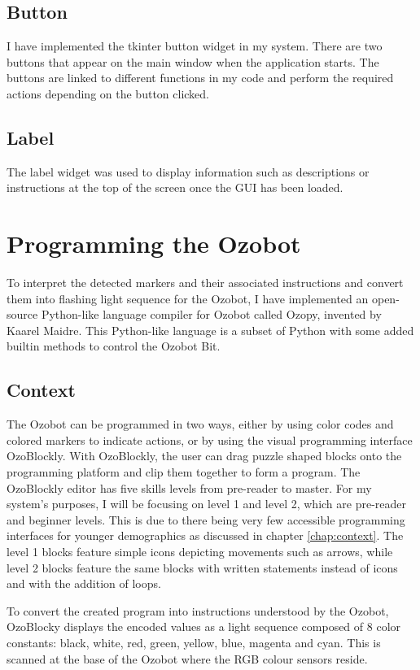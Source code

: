 \documentclass[oneside,%
                    author={Malak Hajji},
                    degree={BSc},
                    title={Designing An Accessible Ozobot Programming Platform for Students},
                  subtitle={With Mixed Visual Abilities}]{dissertation}
\begin{document}
\subsection{Button}
I have implemented the tkinter button widget in my system. There are two buttons that appear on the main window when the application starts. The buttons are linked to different functions in my code and perform the required actions depending on the button clicked.

\subsection{Label}
The label widget was used to display information such as descriptions or instructions at the top of the screen once the GUI has been loaded. 

\section{Programming the Ozobot}
To interpret the detected markers and their associated instructions and convert them into flashing light sequence for the Ozobot, I have implemented an open-source Python-like language compiler for Ozobot called Ozopy, invented by Kaarel Maidre\cite{ozopy}. This Python-like language is a subset of Python with some added builtin methods to control the Ozobot Bit.

\subsection{Context}

The Ozobot can be programmed in two ways, either by using color codes and colored markers to indicate actions, or by using the visual programming interface OzoBlockly. With OzoBlockly, the user can drag puzzle shaped blocks onto the programming platform and clip them together to form a program. The OzoBlockly editor has five skills levels from pre-reader to master.
For my system’s purposes, I will be focusing on level 1 and level 2, which are pre-reader and beginner levels. This is due to there being very few accessible programming interfaces for younger demographics as discussed in chapter \ref{chap:context}. The level 1 blocks feature simple icons depicting movements such as arrows, while level 2 blocks feature the same blocks with written statements instead of icons and with the addition of loops. 

To convert the created program into instructions understood by the Ozobot, OzoBlocky displays the encoded values as a light sequence composed of 8 color constants: black, white, red, green, yellow, blue, magenta and cyan. This is scanned at the base of the Ozobot where the RGB colour sensors reside. 
\end{document}
